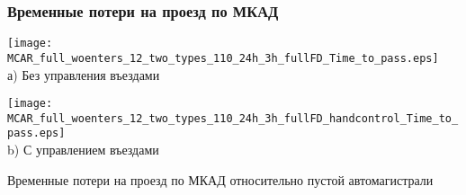 \begin{frame}
    \frametitle{Временные потери на проезд по МКАД}
    \centering
    \begin{minipage}[b]{.49\textwidth}
        \centering
        \texttt{[image: MCAR\_full\_woenters\_12\_two\_types\_110\_24h\_3h\_fullFD\_Time\_to\_pass.eps]}  \\ а) Без управления въездами
    \end{minipage}
    \hfill
    \begin{minipage}[b]{.49\textwidth}
        \centering
        \texttt{[image: MCAR\_full\_woenters\_12\_two\_types\_110\_24h\_3h\_fullFD\_handcontrol\_Time\_to\_pass.eps]}  \\ b) С управлением въездами
    \end{minipage}
    \hfill
    Временные потери на проезд по МКАД относительно пустой автомагистрали
\end{frame}


